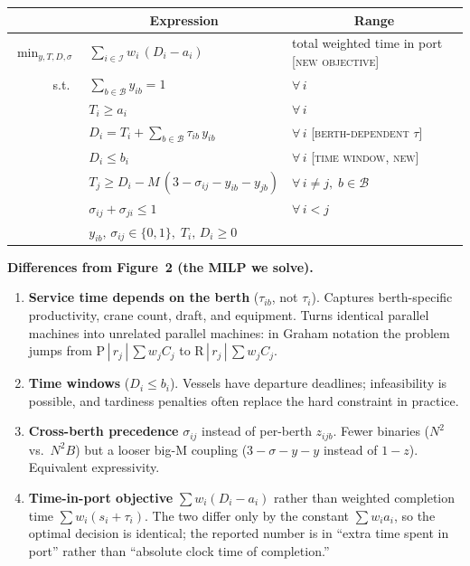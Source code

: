 \documentclass[11pt]{article}
\begin{document}
\begin{center}
\renewcommand{\arraystretch}{1.35}
\begin{tabular}{@{}r l l@{}}
\toprule
& \multicolumn{1}{c}{Expression} & \multicolumn{1}{c}{Range} \\
\midrule
$\displaystyle\min_{y,T,D,\sigma}$ &
$\displaystyle\sum_{i\in\mathcal{I}} w_i\,(D_i - a_i)$ &
total weighted time in port \textsc{[new objective]} \\
\midrule
s.t.\ &
$\displaystyle\sum_{b\in\mathcal{B}} y_{ib} = 1$ &
$\forall\, i$ \\

&
$T_i \geq a_i$ &
$\forall\, i$ \\

&
$D_i = T_i + \displaystyle\sum_{b\in\mathcal{B}} \tau_{ib}\, y_{ib}$ &
$\forall\, i$ \quad\textsc{[berth-dependent $\tau$]} \\

&
$D_i \leq b_i$ &
$\forall\, i$ \quad\textsc{[time window, new]} \\

&
$T_j \geq D_i - M\,(3 - \sigma_{ij} - y_{ib} - y_{jb})$ &
$\forall\, i\neq j,\; b\in\mathcal{B}$ \\

&
$\sigma_{ij} + \sigma_{ji} \leq 1$ &
$\forall\, i<j$ \\

&
$y_{ib},\,\sigma_{ij}\in\{0,1\},\; T_i,\,D_i\geq 0$ &
\\
\bottomrule
\end{tabular}
\end{center}

\vspace{0.6em}

\noindent\textbf{Differences from Figure~2 (the MILP we solve).}
\begin{enumerate}[leftmargin=2em, itemsep=1pt]
  \item \textbf{Service time depends on the berth} ($\tau_{ib}$, not
        $\tau_i$). Captures berth-specific productivity, crane count,
        draft, and equipment. Turns identical parallel machines into
        unrelated parallel machines: in Graham notation the problem
        jumps from $\mathrm{P}\,|\,r_j\,|\,\sum w_j C_j$ to
        $\mathrm{R}\,|\,r_j\,|\,\sum w_j C_j$.
  \item \textbf{Time windows} ($D_i \leq b_i$). Vessels have departure
        deadlines; infeasibility is possible, and tardiness penalties
        often replace the hard constraint in practice.
  \item \textbf{Cross-berth precedence} $\sigma_{ij}$ instead of
        per-berth $z_{ijb}$. Fewer binaries ($N^2$ vs.\ $N^2 B$) but a
        looser big-M coupling ($3 -\sigma -y -y$ instead of
        $1-z$). Equivalent expressivity.
  \item \textbf{Time-in-port objective} $\sum w_i (D_i - a_i)$ rather
        than weighted completion time $\sum w_i (s_i + \tau_i)$. The
        two differ only by the constant $\sum w_i a_i$, so the
        optimal decision is identical; the reported number is in
        ``extra time spent in port'' rather than ``absolute clock
        time of completion.''
\end{enumerate}
\end{document}
